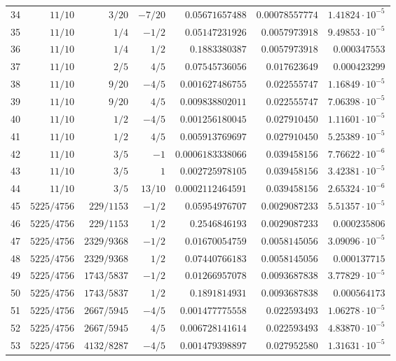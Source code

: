 \documentclass[11pt,reqno]{amsart}
\numberwithin{equation}{section}
\theoremstyle{definition}
\theoremstyle{remark}
\begin{document}
\begin{center}
\begin{longtable}{@{}rrrrrrr@{}}
34 & $11/10$ & $3/20$ & $-7/20$ & $0.05671657488$ & $0.00078557774$ & $1.41824\cdot10^{-5}$\\
35 & $11/10$ & $1/4$ & $-1/2$ & $0.05147231926$ & $0.0057973918$ & $9.49853\cdot10^{-5}$\\
36 & $11/10$ & $1/4$ & $1/2$ & $0.1883380387$ & $0.0057973918$ & $0.000347553$\\
37 & $11/10$ & $2/5$ & $4/5$ & $0.07545736056$ & $0.017623649$ & $0.000423299$\\
38 & $11/10$ & $9/20$ & $-4/5$ & $0.001627486755$ & $0.022555747$ & $1.16849\cdot10^{-5}$\\
39 & $11/10$ & $9/20$ & $4/5$ & $0.009838802011$ & $0.022555747$ & $7.06398\cdot10^{-5}$\\
40 & $11/10$ & $1/2$ & $-4/5$ & $0.001256180045$ & $0.027910450$ & $1.11601\cdot10^{-5}$\\
41 & $11/10$ & $1/2$ & $4/5$ & $0.005913769697$ & $0.027910450$ & $5.25389\cdot10^{-5}$\\
42 & $11/10$ & $3/5$ & $-1$ & $0.0006183338066$ & $0.039458156$ & $7.76622\cdot10^{-6}$\\
43 & $11/10$ & $3/5$ & $1$ & $0.002725978105$ & $0.039458156$ & $3.42381\cdot10^{-5}$\\
44 & $11/10$ & $3/5$ & $13/10$ & $0.0002112464591$ & $0.039458156$ & $2.65324\cdot10^{-6}$\\
45 & $5225/4756$ & $229/1153$ & $-1/2$ & $0.05954976707$ & $0.0029087233$ & $5.51357\cdot10^{-5}$\\
46 & $5225/4756$ & $229/1153$ & $1/2$ & $0.2546846193$ & $0.0029087233$ & $0.000235806$\\
47 & $5225/4756$ & $2329/9368$ & $-1/2$ & $0.01670054759$ & $0.0058145056$ & $3.09096\cdot10^{-5}$\\
48 & $5225/4756$ & $2329/9368$ & $1/2$ & $0.07440766183$ & $0.0058145056$ & $0.000137715$\\
49 & $5225/4756$ & $1743/5837$ & $-1/2$ & $0.01266957078$ & $0.0093687838$ & $3.77829\cdot10^{-5}$\\
50 & $5225/4756$ & $1743/5837$ & $1/2$ & $0.1891814931$ & $0.0093687838$ & $0.000564173$\\
51 & $5225/4756$ & $2667/5945$ & $-4/5$ & $0.001477775558$ & $0.022593493$ & $1.06278\cdot10^{-5}$\\
52 & $5225/4756$ & $2667/5945$ & $4/5$ & $0.006728141614$ & $0.022593493$ & $4.83870\cdot10^{-5}$\\
53 & $5225/4756$ & $4132/8287$ & $-4/5$ & $0.001479398897$ & $0.027952580$ & $1.31631\cdot10^{-5}$\\

\end{longtable}
\end{center}
\end{document}
